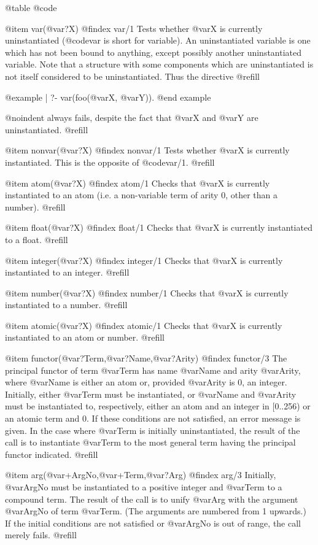 @table @code

@item var(@var{?X})
@findex var/1
Tests whether @var{X} is currently uninstantiated (@code{var} is short for
variable).  An uninstantiated variable is one which has not been bound to
anything, except possibly another uninstantiated variable.  Note that a
structure with some components which are uninstantiated is not itself
considered to be uninstantiated.  Thus the directive @refill

@example
| ?- var(foo(@var{X}, @var{Y})).
@end example

@noindent
always fails, despite the fact that @var{X} and @var{Y} are
uninstantiated. @refill

@item nonvar(@var{?X})
@findex nonvar/1
Tests whether @var{X} is currently instantiated.  This is the opposite of
@code{var/1}. @refill

@item atom(@var{?X})
@findex atom/1
Checks that @var{X} is currently instantiated to an atom (i.e. a
non-variable term of arity 0, other than a number). @refill

@item float(@var{?X})
@findex float/1
Checks that @var{X} is currently instantiated to a float. @refill

@item integer(@var{?X})
@findex integer/1
Checks that @var{X} is currently instantiated to an integer. @refill

@item number(@var{?X})
@findex number/1
Checks that @var{X} is currently instantiated to a number. @refill

@item atomic(@var{?X})
@findex atomic/1
Checks that @var{X} is currently instantiated to an atom or number. @refill

@item functor(@var{?Term},@var{?Name},@var{?Arity})
@findex functor/3
The principal functor of term @var{Term} has name @var{Name} and arity
@var{Arity}, where @var{Name} is either an atom or, provided @var{Arity}
is 0, an integer.  Initially, either @var{Term} must be instantiated, or
@var{Name} and @var{Arity} must be instantiated to, respectively, either
an atom and an integer in [0..256) or an atomic term and 0.  If these
conditions are not satisfied, an error message is given.  In the case
where @var{Term} is initially uninstantiated, the result of the call is
to instantiate @var{Term} to the most general term having the principal
functor indicated. @refill

@item arg(@var{+ArgNo},@var{+Term},@var{?Arg})
@findex arg/3
Initially, @var{ArgNo} must be instantiated to a positive integer and
@var{Term} to a compound term.  The result of the call is to unify
@var{Arg} with the argument @var{ArgNo} of term @var{Term}.  (The arguments
are numbered from 1 upwards.)  If the initial conditions are not satisfied
or @var{ArgNo} is out of range, the call merely fails. @refill

